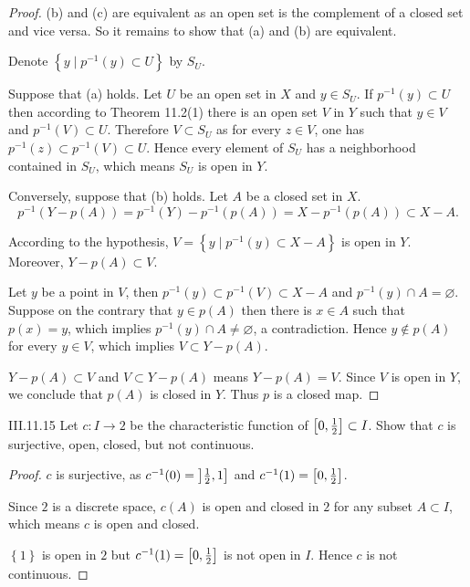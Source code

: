 \begin{proof}
    (b) and (c) are equivalent as an open set is the complement of a closed set and vice versa. So it remains to show that (a) and (b) are equivalent.

    Denote \( \left\{ y \mid p^{-1}(y) \subset U \right\} \) by \( S_{U} \).

    Suppose that (a) holds. Let \( U \) be an open set in \( X \) and \( y \in S_{U} \). If \( p^{-1}(y) \subset U \) then according to Theorem 11.2(1) there is an open set \( V \) in \( Y \) such that \( y \in V \) and \( p^{-1}(V) \subset U \). Therefore \( V \subset S_{U} \) as for every \( z \in V \), one has \( p^{-1}(z) \subset p^{-1}(V) \subset U \). Hence every element of \( S_{U} \) has a neighborhood contained in \( S_{U}\), which means \( S_{U} \) is open in \( Y \).

    Conversely, suppose that (b) holds. Let \( A \) be a closed set in \( X \).
    \[
        p^{-1}(Y - p(A)) = p^{-1}(Y) - p^{-1}(p(A)) = X - p^{-1}(p(A)) \subset X - A.
    \]

    According to the hypothesis, \( V = \left\{ y \mid p^{-1}(y) \subset X - A \right\} \) is open in \( Y \). Moreover, \( Y - p(A) \subset V \).

    Let \( y \) be a point in \( V \), then \( p^{-1}(y) \subset p^{-1}(V) \subset X - A \) and \( p^{-1}(y) \cap A = \varnothing \). Suppose on the contrary that \( y \in p(A) \) then there is \( x \in A \) such that \( p(x) = y \), which implies \( p^{-1}(y) \cap A \ne \varnothing \), a contradiction. Hence \( y \notin p(A) \) for every \( y \in V \), which implies \( V \subset Y - p(A) \).

    \( Y - p(A) \subset V \) and \( V \subset Y - p(A) \) means \( Y - p(A) = V \). Since \( V \) is open in \( Y \), we conclude that \( p(A) \) is closed in \( Y \). Thus \( p \) is a closed map.
\end{proof}

\begin{problem}{III.11.15}
Let \( c: I \to 2 \) be the characteristic function of \(\left\lbrack{0, \frac{1}{2}}\right\rbrack \subset I \). Show that \( c \) is surjective, open, closed, but not continuous.
\end{problem}

\begin{proof}
    \( c \) is surjective, as \( c^{-1}(0) = \left\rbrack{\frac{1}{2}, 1}\right\rbrack \) and \( c^{-1}(1) = \left\lbrack{0, \frac{1}{2}}\right\rbrack \).

    Since \(2\) is a discrete space, \( c(A) \) is open and closed in \( 2 \) for any subset \( A \subset I \), which means \( c \) is open and closed.

    \( \left\{ 1 \right\} \) is open in \( 2 \) but \( c^{-1}(1) = \left\lbrack{0, \frac{1}{2}}\right\rbrack \) is not open in \( I \). Hence \(c\) is not continuous.
\end{proof}

